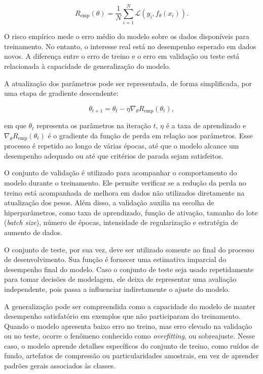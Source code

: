 \documentclass[
    12pt,
    openright,
    oneside,
    a4paper,
    english,
    brazil
]{abntex2}
\begin{document}
\[
R_{\text{emp}}(\theta)
=
\frac{1}{N}
\sum_{i=1}^{N}
\mathcal{L}(y_i, f_{\theta}(x_i)).
\]

O risco empírico mede o erro médio do modelo sobre os dados disponíveis para treinamento. No entanto, o interesse real está no desempenho esperado em dados novos. A diferença entre o erro de treino e o erro em validação ou teste está relacionada à capacidade de generalização do modelo.

A atualização dos parâmetros pode ser representada, de forma simplificada, por uma etapa de gradiente descendente:

\[
\theta_{t+1}
=
\theta_t
-
\eta
\nabla_{\theta}
R_{\text{emp}}(\theta_t),
\]

em que \(\theta_t\) representa os parâmetros na iteração \(t\), \(\eta\) é a taxa de aprendizado e \(\nabla_{\theta}R_{\text{emp}}(\theta_t)\) é o gradiente da função de perda em relação aos parâmetros. Esse processo é repetido ao longo de várias épocas, até que o modelo alcance um desempenho adequado ou até que critérios de parada sejam satisfeitos.

O conjunto de validação é utilizado para acompanhar o comportamento do modelo durante o treinamento. Ele permite verificar se a redução da perda no treino está acompanhada de melhora em dados não utilizados diretamente na atualização dos pesos. Além disso, a validação auxilia na escolha de hiperparâmetros, como taxa de aprendizado, função de ativação, tamanho do lote (\textit{batch size}), número de épocas, intensidade de regularização e estratégia de aumento de dados.

O conjunto de teste, por sua vez, deve ser utilizado somente ao final do processo de desenvolvimento. Sua função é fornecer uma estimativa imparcial do desempenho final do modelo. Caso o conjunto de teste seja usado repetidamente para tomar decisões de modelagem, ele deixa de representar uma avaliação independente, pois passa a influenciar indiretamente o ajuste do modelo.

A generalização pode ser compreendida como a capacidade do modelo de manter desempenho satisfatório em exemplos que não participaram do treinamento. Quando o modelo apresenta baixo erro no treino, mas erro elevado na validação ou no teste, ocorre o fenômeno conhecido como \textit{overfitting}, ou sobreajuste. Nesse caso, o modelo aprende detalhes específicos do conjunto de treino, como ruídos de fundo, artefatos de compressão ou particularidades amostrais, em vez de aprender padrões gerais associados às classes.
\end{document}

